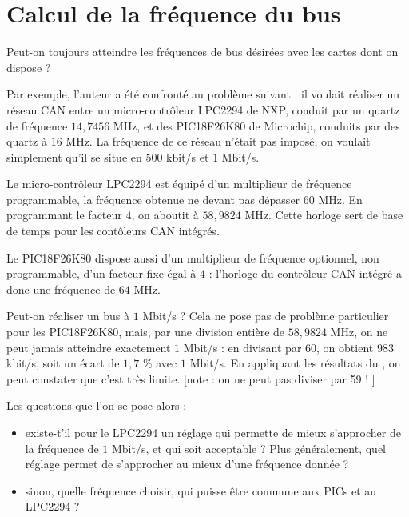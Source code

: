 

\chapter{Calcul de la fréquence du bus}

\thispagestyle{empty}

Peut-on toujours atteindre les fréquences de bus désirées avec les cartes dont on dispose ?

Par exemple, l'auteur a été confronté au problème suivant : il voulait réaliser un réseau CAN entre un micro-contrôleur LPC2294 de NXP, conduit par un quartz de fréquence $14,7456$ MHz, et des PIC18F26K80 de Microchip, conduits par des quartz à $16$ MHz. La fréquence de ce réseau n'était pas imposé, on voulait simplement qu'il se situe en $500$ kbit/s et $1$ Mbit/s.

Le micro-contrôleur LPC2294 est équipé d'un multiplieur de fréquence programmable, la fréquence obtenue ne devant pas dépasser $60$ MHz. En programmant le facteur $4$, on aboutit à $58,9824$ MHz. Cette horloge sert de base de temps pour les contôleurs CAN intégrés. 

Le PIC18F26K80 dispose aussi d'un multiplieur de fréquence optionnel, non programmable, d'un facteur fixe égal à $4$ : l'horloge du contrôleur CAN intégré a donc une fréquence de $64$ MHz.

Peut-on réaliser un bus à $1$ Mbit/s ? Cela ne pose pas de problème particulier pour les PIC18F26K80, mais, par une division entière de $58,9824$ MHz, on ne peut jamais atteindre exactement $1$ Mbit/s : en divisant par $60$, on obtient $983$ kbit/s, soit un écart de $1,7$ \% avec $1$ Mbit/s. En appliquant les résultats du , on peut constater que c'est très limite. [note : on ne peut pas diviser par 59 ! \pasFini]

Les questions que l'on se pose alors :
\begin{itemize}
  \item existe-t'il pour le LPC2294 un réglage qui permette de mieux s'approcher de la fréquence de $1$ Mbit/s, et qui soit acceptable ? Plus généralement, quel réglage permet de s'approcher au mieux d'une fréquence donnée ?
  \item sinon, quelle fréquence choisir, qui puisse être commune aux PICs et au LPC2294 ?
\end{itemize}

